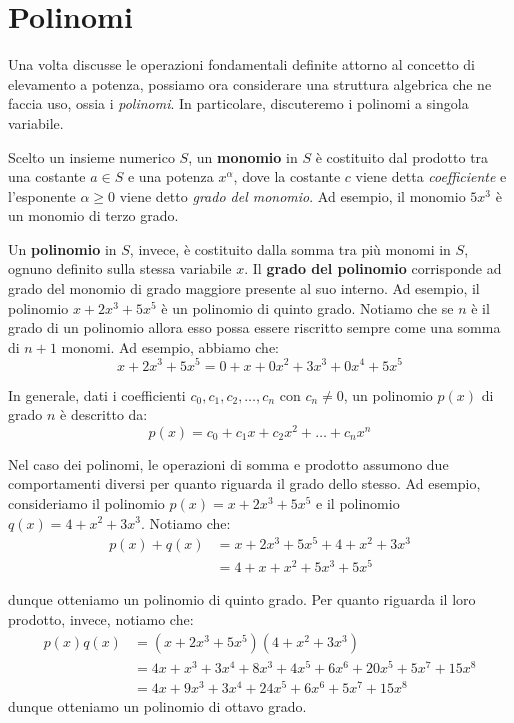\documentclass[a4paper, 12pt]{report}
\begin{document}
    \newpage

    \section{Polinomi}

    Una volta discusse le operazioni fondamentali definite attorno al concetto di elevamento a potenza, possiamo ora considerare una struttura algebrica che ne faccia uso, ossia i \textit{polinomi}. In particolare, discuteremo i polinomi a singola variabile.

    Scelto un insieme numerico $S$, un \textbf{monomio} in $S$ è costituito dal prodotto tra una costante $a \in S$ e una potenza $x^\alpha$, dove la costante $c$ viene detta \textit{coefficiente} e l'esponente $\alpha \geq 0$ viene detto \textit{grado del monomio}. Ad esempio, il monomio $5x^3$ è un monomio di terzo grado.

    Un \textbf{polinomio} in $S$, invece, è costituito dalla somma tra più monomi in $S$, ognuno definito sulla stessa variabile $x$. Il \textbf{grado del polinomio} corrisponde ad grado del monomio di grado maggiore presente al suo interno. Ad esempio, il polinomio $x+2x^3+5x^5$ è un polinomio di quinto grado. Notiamo che se $n$ è il grado di un polinomio allora esso possa essere riscritto sempre come una somma di $n+1$ monomi. Ad esempio, abbiamo che:
    \[x+2x^3+5x^5 = 0 + x + 0x^2 + 3x^3 + 0x^4 + 5x^5\]

    In generale, dati i coefficienti $c_0, c_1, c_2, \ldots, c_n$ con $c_n \neq 0$, un polinomio $p(x)$ di grado $n$ è descritto da:
    \[p(x) = c_0 + c_1x + c_2x^2 + \ldots + c_n x^n\]

    Nel caso dei polinomi, le operazioni di somma e prodotto assumono due comportamenti diversi per quanto riguarda il grado dello stesso. Ad esempio, consideriamo il polinomio $p(x) = x+2x^3+5x^5$ e il polinomio $q(x) = 4+x^2+3x^3$. Notiamo che:
    \[\begin{split}
        p(x) + q(x) &= x+2x^3+5x^5 + 4+x^2+3x^3 \\
        &= 4+x+x^2+5x^3+5x^5
    \end{split}\]

    dunque otteniamo un polinomio di quinto grado. Per quanto riguarda il loro prodotto, invece, notiamo che:
    \[\begin{split}
        p(x)q(x) &= (x+2x^3+5x^5)(4+x^2+3x^3) \\
        &= 4x+x^3+3x^4+8x^3+4x^5+6x^6+20x^5+5x^7+15x^8 \\
        &= 4x + 9x^3 + 3x^4 + 24x^5+6x^6+5x^7+15x^8
    \end{split}\]
    dunque otteniamo un polinomio di ottavo grado.
    
\end{document}
